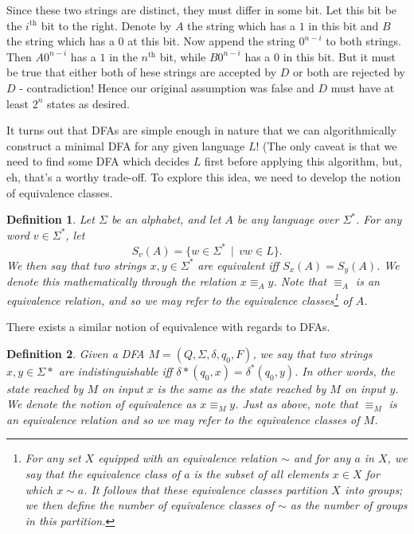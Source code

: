 \documentclass[11pt]{article}
\newtheorem{defn}{Definition}[section]
\newcounter{enum}
\begin{document}
\begin{enumerate}
\begin{enumerate}
\par Since these two strings are distinct, they must differ in some bit.  Let this bit be the $i^{\text{th}}$ bit to the right.  Denote by $A$ the string which has a $1$ in this bit and $B$ the string which has a $0$ at this bit.  Now append the string $0^{n-i}$ to both strings.  Then $A0^{n-i}$ has a $1$ in the $n^{\text{th}}$ bit, while $B0^{n-i}$ has a $0$ in this bit.  But it must be true that either both of hese strings are accepted by $D$ or both are rejected by $D$ - contradiction!  Hence our original assumption was false and $D$ must have at least $2^n$ states as desired.

\end{enumerate}

\end{enumerate}

\par It turns out that DFAs are simple enough in nature that we can algorithmically construct a minimal DFA for any given language $L$!  (The only caveat is that we need to find some DFA which decides $L$ first before applying this algorithm, but, eh, that's a worthy trade-off.  To explore this idea, we need to develop the notion of equivalence classes.

\begin{defn}
Let $\Sigma$ be an alphabet, and let $A$ be any language over $\Sigma^*$.  For any word $v\in \Sigma^*$, let \[S_v(A)=\{w\in\Sigma^*\,\mid\, vw\in L\} .\] We then say that two strings $x,y\in\Sigma^*$ are \textit{equivalent} iff $S_x(A) = S_y(A)$.  We denote this mathematically through the relation $x\equiv_A y$.  Note that $\equiv_A$ is an equivalence relation, and so we may refer to the equivalence classes\footnote{For any set $X$ equipped with an equivalence relation $\sim$ and for any $a$ in $X$, we say that the equivalence class of $a$ is the subset of all elements $x\in X$ for which $x\sim a$.  It follows that these equivalence classes partition $X$ into groups; we then define the number of equivalence classes of $\sim$ as the number of groups in this partition.} of $A$.
\end{defn}

\par There exists a similar notion of equivalence with regards to DFAs.

\begin{defn}
Given a DFA $M=(Q,\Sigma,\delta, q_0, F)$, we say that two strings $x,y\in\Sigma*$ are \textit{indistinguishable} iff $\delta*(q_0,x)=\delta^*(q_0,y)$.  In other words, the state reached by $M$ on input $x$ is the same as the state reached by $M$ on input $y$.  We denote the notion of equivalence as $x\equiv_M y$.  Just as above, note that $\equiv_M$ is an equivalence relation and so we may refer to the equivalence classes of $M$.
\end{defn}
\end{document}
